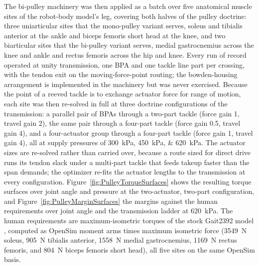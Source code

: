 \documentclass[utf8]{FrontiersinHarvard} %
\begin{document}
The bi-pulley machinery was then applied as a batch over five anatomical muscle sites of the robot-body model's leg, covering both halves of the pulley doctrine: three uniarticular sites that the mono-pulley variant serves, soleus and tibialis anterior at the ankle and biceps femoris short head at the knee, and two biarticular sites that the bi-pulley variant serves, medial gastrocnemius across the knee and ankle and rectus femoris across the hip and knee. Every run of record operated at unity transmission, one BPA and one tackle line part per crossing, with the tendon exit on the moving-force-point routing; the bowden-housing arrangement is implemented in the machinery but was never exercised. Because the point of a reeved tackle is to exchange actuator force for range of motion, each site was then re-solved in full at three doctrine configurations of the transmission: a parallel pair of BPAs through a two-part tackle (force gain 1, travel gain 2), the same pair through a four-part tackle (force gain 0.5, travel gain 4), and a four-actuator group through a four-part tackle (force gain 1, travel gain 4), all at supply pressures of \qtylist{300;450;620}{\kPa}. The actuator sizes are re-solved rather than carried over, because a route sized for direct drive runs its tendon slack under a multi-part tackle that feeds takeup faster than the span demands; the optimizer re-fits the actuator lengths to the transmission at every configuration. Figure~\ref{fig:PulleyTorqueSurfaces} shows the resulting torque surfaces over joint angle and pressure at the two-actuator, two-part configuration, and Figure~\ref{fig:PulleyMarginSurfaces} the margins against the human requirements over joint angle and the transmission ladder at \qty{620}{\kPa}. The human requirements are maximum-isometric torques of the stock Gait2392 model \citep{delp_opensim_2007, seth_opensim_2018}, computed as OpenSim moment arms times maximum isometric force (\qty{3549}{\N} soleus, \qty{905}{\N} tibialis anterior, \qty{1558}{\N} medial gastrocnemius, \qty{1169}{\N} rectus femoris, and \qty{804}{\N} biceps femoris short head), all five sites on the same OpenSim basis.
\end{document}
